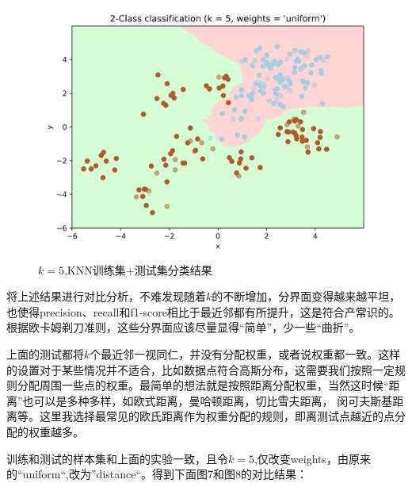 \documentclass{article}
\newcommand{\hs}{\hspace{2em}}
\begin{document}
\begin{figure}[H]
	\centering
	\includegraphics[width=0.6\linewidth]{img//fig4.png}
	\caption{$k=5$,KNN训练集+测试集分类结果}
\end{figure}

\hs  将上述结果进行对比分析，不难发现随着$k$的不断增加，分界面变得越来越平坦，也使得precision、recall和f1-score相比于最近邻都有所提升，这是符合产常识的。根据欧卡姆剃刀准则，这些分界面应该尽量显得“简单”，少一些“曲折”。\\


{}

\hs  上面的测试都将$k$个最近邻一视同仁，并没有分配权重，或者说权重都一致。这样的设置对于某些情况并不适合，比如数据点符合高斯分布，这需要我们按照一定规则分配周围一些点的权重。最简单的想法就是按照距离分配权重，当然这时候“距离”也可以是多种多样，如欧式距离，曼哈顿距离，切比雪夫距离， 闵可夫斯基距离等。这里我选择最常见的欧氏距离作为权重分配的规则，即离测试点越近的点分配的权重越多。

\hs 训练和测试的样本集和上面的实验一致，且令$k=5$,仅改变weights，由原来的“uniform“,改为”distance“。得到下面图7和图8的对比结果：
\end{document}
